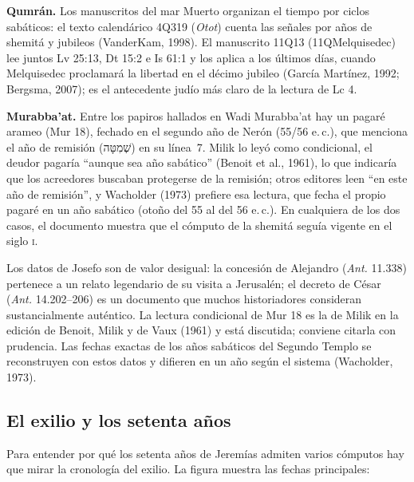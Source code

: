 \documentclass[11pt,letterpaper]{article}
\newcommand{\heb}[1]{\mbox{\foreignlanguage{hebrew}{#1}}}
\begin{document}
\textbf{Qumrán.} Los manuscritos del mar Muerto organizan el tiempo por ciclos sabáticos: el texto calendárico 4Q319 (\emph{Otot}) cuenta las señales por años de shemitá y jubileos (VanderKam, 1998). El manuscrito 11Q13 (11QMelquisedec) lee juntos Lv 25:13, Dt 15:2 e Is 61:1 y los aplica a los últimos días, cuando Melquisedec proclamará la libertad en el décimo jubileo (García Martínez, 1992; Bergsma, 2007); es el antecedente judío más claro de la lectura de Lc 4.

\textbf{Murabba'at.} Entre los papiros hallados en Wadi Murabba'at hay un pagaré arameo (Mur 18), fechado en el segundo año de Nerón (55/56 e.\,c.), que menciona el año de remisión (\heb{שְׁמִטָּה}) en su línea~7. Milik lo leyó como condicional, el deudor pagaría ``aunque sea año sabático'' (Benoit et al., 1961), lo que indicaría que los acreedores buscaban protegerse de la remisión; otros editores leen ``en este año de remisión'', y Wacholder (1973) prefiere esa lectura, que fecha el propio pagaré en un año sabático (otoño del 55 al del 56 e.\,c.). En cualquiera de los dos casos, el documento muestra que el cómputo de la shemitá seguía vigente en el siglo \textsc{i}.

\begin{nota}[Precisión]
Los datos de Josefo son de valor desigual: la concesión de Alejandro (\emph{Ant.} 11.338) pertenece a un relato legendario de su visita a Jerusalén; el decreto de César (\emph{Ant.} 14.202--206) es un documento que muchos historiadores consideran sustancialmente auténtico. La lectura condicional de Mur 18 es la de Milik en la edición de Benoit, Milik y de Vaux (1961) y está discutida; conviene citarla con prudencia. Las fechas exactas de los años sabáticos del Segundo Templo se reconstruyen con estos datos y difieren en un año según el sistema (Wacholder, 1973).
\end{nota}

\subsection{El exilio y los setenta años}
Para entender por qué los setenta años de Jeremías admiten varios cómputos hay que mirar la cronología del exilio. La figura muestra las fechas principales:
\end{document}
